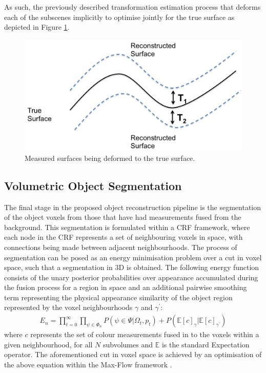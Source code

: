 As such, the previously described transformation estimation process that deforms each of the subscenes implicitly to optimise jointly for the true 
surface as depicted in Figure \ref{fig:deformationDiagram}.
\begin{figure}[!t]
	\centering
	\includegraphics[scale=0.25]{deformation.png}
	\caption{Measured surfaces being deformed to the true surface.}
	\label{fig:deformationDiagram}
\end{figure}

\subsection{Volumetric Object Segmentation}
\label{subsec:shapeoptimisation}

The final stage in the proposed object reconstruction pipeline is the segmentation of the object voxels from those that have had measurements fused 
from the background. This segmentation is formulated within a CRF framework, where each node in the CRF represents a set of neighbouring voxels in space, 
with connections being made between adjacent neighbourhoods. The process of segmentation can be posed as an energy minimisation problem over a cut in voxel space, 
such that a segmentation in 3D is obtained. The following energy function consists of the unary posterior probabilities over appearance accumulated during the fusion 
process for a region in space and an additional pairwise smoothing term representing the physical appearance similarity of the object region represented by the voxel 
neighbourhoods $\gamma$ and $\gamma^{'}$:
\begin{equation}
\begin{split}
E_{n} = \prod_{t=0}^{\infty} \prod_{\psi \in \Phi_{n}} P(\psi \in \Psi | \Omega_{t}, p_{t}) + P(\mathbb{E}[c]_{\gamma} | \mathbb{E}[c]_{\gamma^{'}})
\end{split}
\end{equation}
where $c$ represents the set of colour measurements fused in to the voxels within a given neighbourhood, for all $N$ subvolumes and $\mathbb{E}$ is the standard Expectation operator.
The aforementioned cut in voxel space is achieved by an optimisation of the above equation within the Max-Flow framework \cite{BoykovKolmogorov}. 

